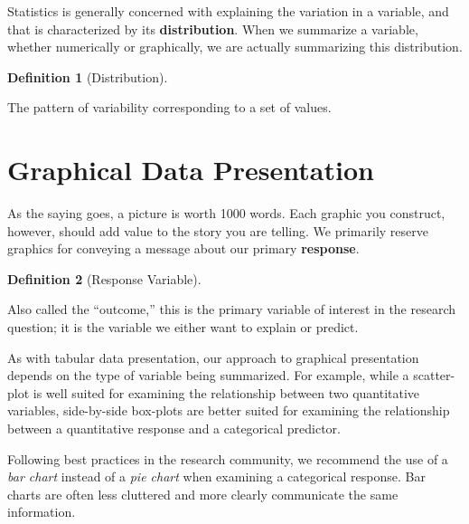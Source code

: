 \documentclass[
  letterpaper,
  DIV=11,
  numbers=noendperiod]{scrreprt}
\theoremstyle{definition}
\newtheorem{definition}{Definition}[chapter]
\theoremstyle{definition}
\theoremstyle{remark}
\begin{document}
Statistics is generally concerned with explaining the variation in a
variable, and that is characterized by its \textbf{distribution}. When
we summarize a variable, whether numerically or graphically, we are
actually summarizing this distribution.

\begin{definition}[Distribution]\protect\hypertarget{def-distribution}{}\label{def-distribution}

The pattern of variability corresponding to a set of values.

\end{definition}

\hypertarget{graphical-data-presentation}{%
\section{Graphical Data
Presentation}\label{graphical-data-presentation}}

As the saying goes, a picture is worth 1000 words. Each graphic you
construct, however, should add value to the story you are telling. We
primarily reserve graphics for conveying a message about our primary
\textbf{response}.

\begin{definition}[Response
Variable]\protect\hypertarget{def-response}{}\label{def-response}

Also called the ``outcome,'' this is the primary variable of interest in
the research question; it is the variable we either want to explain or
predict.

\end{definition}

As with tabular data presentation, our approach to graphical
presentation depends on the type of variable being summarized. For
example, while a scatter-plot is well suited for examining the
relationship between two quantitative variables, side-by-side box-plots
are better suited for examining the relationship between a quantitative
response and a categorical predictor.

\begin{tcolorbox}[enhanced jigsaw, left=2mm, toprule=.15mm, arc=.35mm, breakable, opacitybacktitle=0.6, opacityback=0, rightrule=.15mm, colbacktitle=quarto-callout-note-color!10!white, coltitle=black, leftrule=.75mm, toptitle=1mm, colframe=quarto-callout-note-color-frame, titlerule=0mm, title=\textcolor{quarto-callout-note-color}{\faInfo}\hspace{0.5em}{Note}, bottomrule=.15mm, colback=white, bottomtitle=1mm]

Following best practices in the research community, we recommend the use
of a \emph{bar chart} instead of a \emph{pie chart} when examining a
categorical response. Bar charts are often less cluttered and more
clearly communicate the same information.

\end{tcolorbox}
\end{document}
